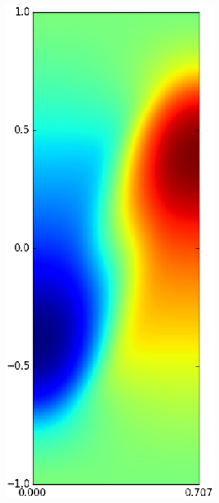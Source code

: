 \begin{figure}
\begin{subfigure}[b]{0.24\textwidth}
\end{subfigure}
\begin{subfigure}[b]{0.24\textwidth}
\includegraphics[width=\textwidth]{gfx/cnv_o16_e32-w_yz-0033}

\end{subfigure}
\end{figure}
